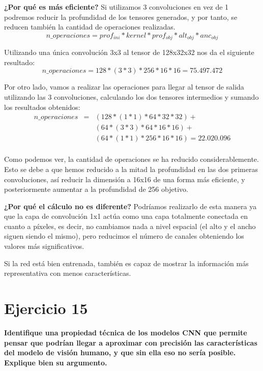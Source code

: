 \documentclass[11pt,a4paper]{article}
\begin{document}
\textbf{¿Por qué es más eficiente?} Si utilizamos 3 convoluciones en vez de 1 podremos reducir la profundidad de los tensores generados, y por tanto, se reducen también
la cantidad de operaciones realizadas.
\begin{equation}
	n\_operaciones = prof_{ini} * kernel * prof_{obj} * alt_{obj} * anc_{obj}
\end{equation}

Utilizando una única convolución 3x3 al tensor de 128x32x32 nos da el siguiente resultado:
\begin{equation}
	n\_operaciones = 128 * (3*3) * 256 * 16 * 16 = 75.497.472
\end{equation}

Por otro lado, vamos a realizar las operaciones para llegar al tensor de salida utilizando las 3 convoluciones, calculando los dos tensores intermedios y sumando los
resultados obtenidos:
\begin{eqnarray*}
	n\_operaciones & = & (128 * (1*1) * 64 * 32 * 32) + \\
	& & (64 * (3*3) * 64 * 16 * 16) + \\
	& & (64 * (1*1) * 256 * 16 * 16) = 22.020.096 \\
\end{eqnarray*}

Como podemos ver, la cantidad de operaciones se ha reducido considerablemente. Esto se debe a que hemos reducido a la mitad la profundidad en las dos primeras convoluciones,
así reducir la dimensión a 16x16 de una forma más eficiente, y posteriormente aumentar a la profundidad de 256 objetivo.

\textbf{¿Por qué el cálculo no es diferente?} Podríamos realizarlo de esta manera ya que la capa de convolución 1x1 actúa como una capa totalmente conectada en cuanto a píxeles,
es decir, no cambiamos nada a nivel espacial (el alto y el ancho siguen siendo el mismo), pero reducimos el número de canales obteniendo los valores más significativos.

Si la red está bien entrenada, también es capaz de mostrar la información más representativa con menos características.


\section*{Ejercicio 15}

\textbf{Identifique una propiedad técnica de los modelos CNN que permite pensar que podrían llegar a aproximar con precisión las características del modelo de visión
humano, y que sin ella eso no sería posible. Explique bien su argumento.}
\end{document}
